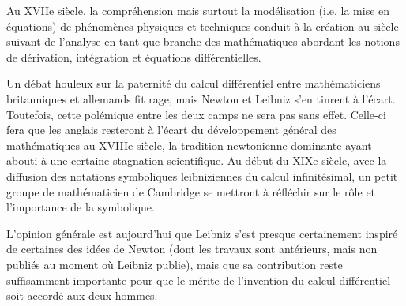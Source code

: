 \begin{histoire}%
Au XVIIe siècle, la compréhension mais surtout la modélisation (i.e. la mise en équations)
de phénomènes physiques et techniques conduit à la création au siècle suivant de
l'analyse en tant que branche des mathématiques
abordant les notions de dérivation, intégration et équations différentielles.

\medskip
{}

Un débat houleux sur la paternité du calcul différentiel entre mathématiciens britanniques et allemands
fit rage, mais Newton et Leibniz s'en tinrent à l'écart.
Toutefois, cette polémique entre les deux camps ne sera pas sans effet.
Celle-ci fera que les anglais resteront à l'écart du développement général des mathématiques
au XVIIIe siècle, la tradition newtonienne dominante ayant abouti à une certaine stagnation
scientifique. Au début du XIXe siècle, avec la diffusion des notations symboliques leibniziennes
du calcul infinitésimal, un petit groupe de mathématicien de Cambridge se mettront
à réfléchir sur le rôle et l'importance de la symbolique.

\medskip
L'opinion générale est aujourd'hui que Leibniz s'est presque
certainement inspiré de certaines des idées de Newton (dont les travaux sont antérieurs, mais non publiés au moment
où Leibniz publie), mais que sa contribution reste suffisamment importante pour que le
mérite de l'invention du calcul différentiel soit accordé aux deux hommes.


\end{histoire}
